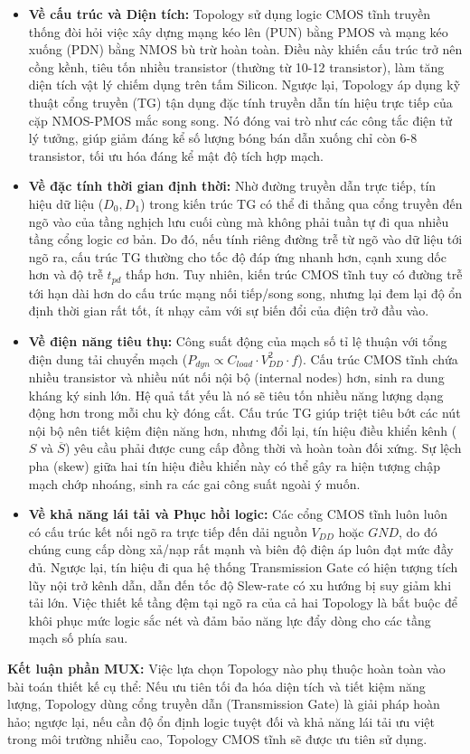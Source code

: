 \documentclass[12pt, a4paper, oneside]{article}
\begin{document}
\begin{itemize}
    \item \textbf{Về cấu trúc và Diện tích:} 
    Topology sử dụng logic CMOS tĩnh truyền thống đòi hỏi việc xây dựng mạng kéo lên (PUN) bằng PMOS và mạng kéo xuống (PDN) bằng NMOS bù trừ hoàn toàn. Điều này khiến cấu trúc trở nên cồng kềnh, tiêu tốn nhiều transistor (thường từ 10-12 transistor), làm tăng diện tích vật lý chiếm dụng trên tấm Silicon. Ngược lại, Topology áp dụng kỹ thuật cổng truyền (TG) tận dụng đặc tính truyền dẫn tín hiệu trực tiếp của cặp NMOS-PMOS mắc song song. Nó đóng vai trò như các công tắc điện tử lý tưởng, giúp giảm đáng kể số lượng bóng bán dẫn xuống chỉ còn 6-8 transistor, tối ưu hóa đáng kể mật độ tích hợp mạch.

    \item \textbf{Về đặc tính thời gian định thời:}
    Nhờ đường truyền dẫn trực tiếp, tín hiệu dữ liệu ($D_0, D_1$) trong kiến trúc TG có thể đi thẳng qua cổng truyền đến ngõ vào của tầng nghịch lưu cuối cùng mà không phải tuần tự đi qua nhiều tầng cổng logic cơ bản. Do đó, nếu tính riêng đường trễ từ ngõ vào dữ liệu tới ngõ ra, cấu trúc TG thường cho tốc độ đáp ứng nhanh hơn, cạnh xung dốc hơn và độ trễ $t_{pd}$ thấp hơn. Tuy nhiên, kiến trúc CMOS tĩnh tuy có đường trễ tới hạn dài hơn do cấu trúc mạng nối tiếp/song song, nhưng lại đem lại độ ổn định thời gian rất tốt, ít nhạy cảm với sự biến đổi của điện trở đầu vào.

    \item \textbf{Về điện năng tiêu thụ:}
    Công suất động của mạch số tỉ lệ thuận với tổng điện dung tải chuyển mạch ($P_{dyn} \propto C_{load} \cdot V_{DD}^2 \cdot f$). Cấu trúc CMOS tĩnh chứa nhiều transistor và nhiều nút nối nội bộ (internal nodes) hơn, sinh ra dung kháng ký sinh lớn. Hệ quả tất yếu là nó sẽ tiêu tốn nhiều năng lượng dạng động hơn trong mỗi chu kỳ đóng cắt. Cấu trúc TG giúp triệt tiêu bớt các nút nội bộ nên tiết kiệm điện năng hơn, nhưng đổi lại, tín hiệu điều khiển kênh ($S$ và $\overline{S}$) yêu cầu phải được cung cấp đồng thời và hoàn toàn đối xứng. Sự lệch pha (skew) giữa hai tín hiệu điều khiển này có thể gây ra hiện tượng chập mạch chớp nhoáng, sinh ra các gai công suất ngoài ý muốn.

    \item \textbf{Về khả năng lái tải và Phục hồi logic:}
    Các cổng CMOS tĩnh luôn luôn có cấu trúc kết nối ngõ ra trực tiếp đến dải nguồn $V_{DD}$ hoặc $GND$, do đó chúng cung cấp dòng xả/nạp rất mạnh và biên độ điện áp luôn đạt mức đầy đủ. Ngược lại, tín hiệu đi qua hệ thống Transmission Gate có hiện tượng tích lũy nội trở kênh dẫn, dẫn đến tốc độ Slew-rate có xu hướng bị suy giảm khi tải lớn. Việc thiết kế tầng đệm tại ngõ ra của cả hai Topology là bắt buộc để khôi phục mức logic sắc nét và đảm bảo năng lực đẩy dòng cho các tầng mạch số phía sau.
\end{itemize}

\textbf{Kết luận phần MUX:} 
Việc lựa chọn Topology nào phụ thuộc hoàn toàn vào bài toán thiết kế cụ thể: Nếu ưu tiên tối đa hóa diện tích và tiết kiệm năng lượng, Topology dùng cổng truyền dẫn (Transmission Gate) là giải pháp hoàn hảo; ngược lại, nếu cần độ ổn định logic tuyệt đối và khả năng lái tải ưu việt trong môi trường nhiễu cao, Topology CMOS tĩnh sẽ được ưu tiên sử dụng.
\end{document}
